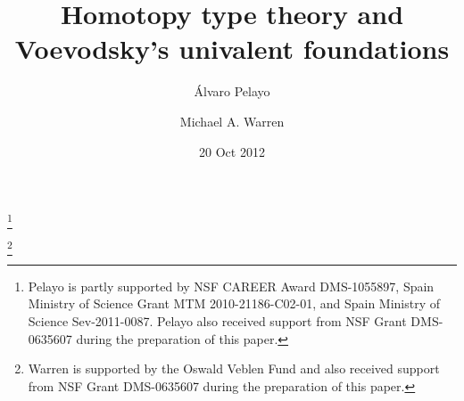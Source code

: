 \documentclass[11pt]{amsart}
\theoremstyle{definition}
\theoremstyle{remark}
\numberwithin{equation}{section}
\begin{document}
\setcounter{myi}{0}

\title[Homotopy type theory]{Homotopy type theory and
  Voevodsky's univalent foundations}


\author[\'{A}. Pelayo]{\'{A}lvaro Pelayo}
\address{Washington University\\  
  Mathematics Department \\
  One Brookings Drive, Campus Box 1146\\
  St Louis, MO 63130, USA, AND School of Mathematics,
  Institute for Advanced Study\\
  Einstein Drive, Princeton\\
  NJ 08540 USA}
\thanks{Pelayo is partly supported by NSF CAREER Award DMS-1055897, Spain 
Ministry of Science Grant MTM 2010-21186-C02-01, and 
Spain Ministry of Science Sev-2011-0087.  Pelayo also received support
from NSF Grant DMS-0635607 during the preparation of this paper.}
\author[M. A. Warren]{Michael A. Warren}
\address{School of Mathematics,
  Institute for Advanced Study\\
  Einstein Drive, Princeton\\
  NJ 08540 USA.}
\curraddr{}
\thanks{Warren is supported by the Oswald Veblen Fund and also
  received support from NSF Grant DMS-0635607 during the preparation
  of this paper.}


\date{20 Oct 2012}

\dedicatory{}
\end{document}
